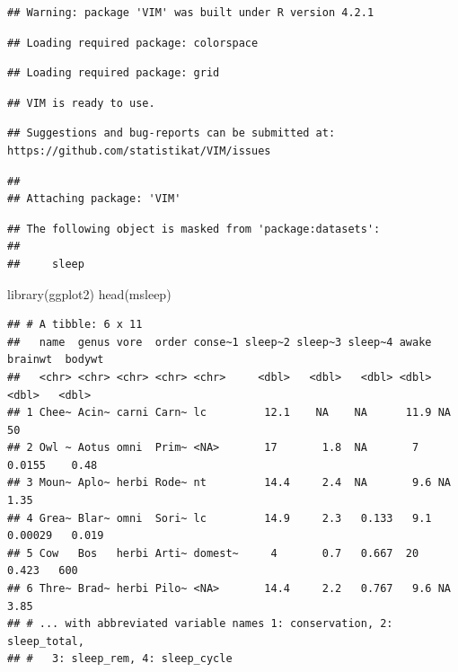 \documentclass[
]{article}
\newenvironment{Shaded}{\begin{snugshade}}{\end{snugshade}}
\newcommand{\FunctionTok}[1]{\textcolor[rgb]{0.00,0.00,0.00}{#1}}
\newcommand{\NormalTok}[1]{#1}
\begin{document}
\begin{verbatim}
## Warning: package 'VIM' was built under R version 4.2.1
\end{verbatim}

\begin{verbatim}
## Loading required package: colorspace
\end{verbatim}

\begin{verbatim}
## Loading required package: grid
\end{verbatim}

\begin{verbatim}
## VIM is ready to use.
\end{verbatim}

\begin{verbatim}
## Suggestions and bug-reports can be submitted at: https://github.com/statistikat/VIM/issues
\end{verbatim}

\begin{verbatim}
## 
## Attaching package: 'VIM'
\end{verbatim}

\begin{verbatim}
## The following object is masked from 'package:datasets':
## 
##     sleep
\end{verbatim}

\begin{Shaded}
\begin{Highlighting}[]
\FunctionTok{library}\NormalTok{(ggplot2)}
\FunctionTok{head}\NormalTok{(msleep)}
\end{Highlighting}
\end{Shaded}

\begin{verbatim}
## # A tibble: 6 x 11
##   name  genus vore  order conse~1 sleep~2 sleep~3 sleep~4 awake  brainwt  bodywt
##   <chr> <chr> <chr> <chr> <chr>     <dbl>   <dbl>   <dbl> <dbl>    <dbl>   <dbl>
## 1 Chee~ Acin~ carni Carn~ lc         12.1    NA    NA      11.9 NA        50    
## 2 Owl ~ Aotus omni  Prim~ <NA>       17       1.8  NA       7    0.0155    0.48 
## 3 Moun~ Aplo~ herbi Rode~ nt         14.4     2.4  NA       9.6 NA         1.35 
## 4 Grea~ Blar~ omni  Sori~ lc         14.9     2.3   0.133   9.1  0.00029   0.019
## 5 Cow   Bos   herbi Arti~ domest~     4       0.7   0.667  20    0.423   600    
## 6 Thre~ Brad~ herbi Pilo~ <NA>       14.4     2.2   0.767   9.6 NA         3.85 
## # ... with abbreviated variable names 1: conservation, 2: sleep_total,
## #   3: sleep_rem, 4: sleep_cycle
\end{verbatim}
\end{document}
